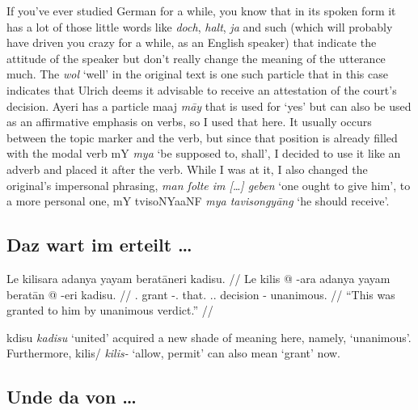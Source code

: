 \documentclass[12pt,paper=a4]{scrartcl}
\newcommand{\fw}[1]{\textit{#1}} %
\newcommand{\ayr}[1]{{\Tagati #1}}
\newcommand{\xayr}[3]{{\Tagati #1} \emph{#2} \enquote*{#3}}
\begin{document}
If you've ever studied German for a while, you know that in its spoken form it 
has a lot of those little words like \fw{doch}, \fw{halt}, \fw{ja} and such 
(which will probably have driven you crazy for a while, as an English speaker) 
that indicate the attitude of the speaker but don't really change the meaning of 
the utterance much. The \fw{wol} `well' in the \Mhg{} original text is one such 
particle that in this case indicates that Ulrich deems it advisable to receive 
an attestation of the court's decision. Ayeri has a particle \ayr{maaj} \fw{māy} 
that is used for `yes' but can also be used as an affirmative emphasis on verbs, 
so I used that here. It usually occurs between the topic marker and 
the verb, but since that position is already filled with the modal verb 
\xayr{mY}{mya}{be supposed to, shall}, I decided to use it like an adverb and 
placed it after the verb. While I was at it, I also changed the original's 
impersonal phrasing, \fw{man ſolte im […] geben} `one ought to give him', to 
a more personal one, \xayr{mY tvisoNYaaNF}{mya tavisongyāng}{he should receive}.

\subsection*{Daz wart im erteilt …}


\ex \begingl
	\glpreamble Le kilisara adanya yayam beratāneri kadisu. //
	\gla Le kilis @ -ara adanya yayam beratān @ -eri kadisu. //
	\glb \PatT{}.\Inan{} grant -\Tsg{}.\Inan{} that.\Top{} 
		\Tsg{}.\M{}.\Dat{} decision -\Ins{} unanimous. //
	\glft \enquote{This was granted to him by unanimous verdict.} //
\endgl \xe

\xayr{kdisu}{kadisu}{united} acquired a new shade of meaning here, namely, 
`unanimous'. Furthermore, \xayr{kilis/}{kilis-}{allow, permit} can also mean 
`grant' now.

\subsection*{Unde da von …}

\end{document}
